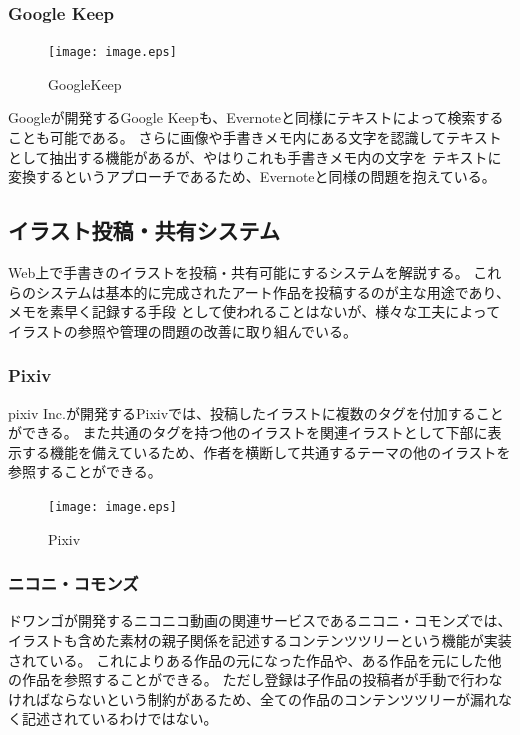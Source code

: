 \subsubsection{Google Keep}

\begin{figure}[htbp]
    \begin{center}
    {\texttt{[image: image.eps]}} \end{center}
    \caption{GoogleKeep}
\end{figure}


Googleが開発するGoogle Keepも、Evernoteと同様にテキストによって検索することも可能である。
さらに画像や手書きメモ内にある文字を認識してテキストとして抽出する機能があるが、やはりこれも手書きメモ内の文字を
テキストに変換するというアプローチであるため、Evernoteと同様の問題を抱えている。

\subsection{イラスト投稿・共有システム}
Web上で手書きのイラストを投稿・共有可能にするシステムを解説する。
これらのシステムは基本的に完成されたアート作品を投稿するのが主な用途であり、メモを素早く記録する手段
として使われることはないが、様々な工夫によってイラストの参照や管理の問題の改善に取り組んでいる。

\subsubsection{Pixiv}

pixiv Inc.が開発するPixivでは、投稿したイラストに複数のタグを付加することができる。
また共通のタグを持つ他のイラストを関連イラストとして下部に表示する機能を備えているため、作者を横断して共通するテーマの他のイラストを参照することができる。

\begin{figure}[htbp]
    \begin{center}
    {\texttt{[image: image.eps]}} \end{center}
    \caption{Pixiv}
\end{figure}


\subsubsection{ニコニ・コモンズ}

ドワンゴが開発するニコニコ動画の関連サービスであるニコニ・コモンズでは、イラストも含めた素材の親子関係を記述するコンテンツツリーという機能が実装されている。
これによりある作品の元になった作品や、ある作品を元にした他の作品を参照することができる。
ただし登録は子作品の投稿者が手動で行わなければならないという制約があるため、全ての作品のコンテンツツリーが漏れなく記述されているわけではない。

